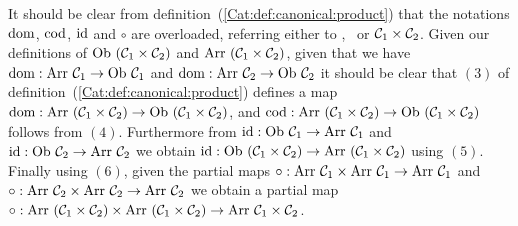 It should be clear from definition~(\ref{Cat:def:canonical:product}) that
the notations $\mbox{\rm dom}$, $\mbox{\rm cod}$, $\mbox{\rm id}$ and $\circ$ are overloaded, 
referring either to \Cone, \Ctwo\ or $\mbox{${\cal C}_{1}$}\times\mbox{${\cal C}_{2}$}$. Given our definitions 
of $\mbox{\rm Ob}\ (\mbox{${\cal C}_{1}$}\times\mbox{${\cal C}_{2}$})$ and $\mbox{\rm Arr}\ (\mbox{${\cal C}_{1}$}\times\mbox{${\cal C}_{2}$})$, given that we 
have $\mbox{\rm dom}:\mbox{\rm Arr}\ \mbox{${\cal C}_{1}$}\to\mbox{\rm Ob}\ \mbox{${\cal C}_{1}$}$ and $\mbox{\rm dom}:\mbox{\rm Arr}\ \mbox{${\cal C}_{2}$}\to\mbox{\rm Ob}\ \mbox{${\cal C}_{2}$}$ it 
should be clear that $(3)$ of definition~(\ref{Cat:def:canonical:product})
defines a map $\dom:\arr\ (\Cone\times\Ctwo)\to\ob\ (\Cone\times\Ctwo)$,
and $\cod:\arr\ (\Cone\times\Ctwo)\to\ob\ (\Cone\times\Ctwo)$
follows from $(4)$. Furthermore from $\id:\ob\ \Cone\to\arr\ \Cone$
and $\id:\ob\ \Ctwo\to\arr\ \Ctwo$ we obtain $\id:\ob\ (\Cone\times\Ctwo)
\to\arr\ (\Cone\times\Ctwo)$ using $(5)$. Finally using $(6)$, given 
the partial maps $\circ:\arr\ \Cone\times\arr\ \Cone\to\arr\ \Cone$
and $\circ:\arr\ \Ctwo\times\arr\ \Ctwo\to\arr\ \Ctwo$ we obtain
a partial map $\circ:\mbox{\rm Arr}\ (\mbox{${\cal C}_{1}$}\times\mbox{${\cal C}_{2}$})\times\mbox{\rm Arr}
\ (\mbox{${\cal C}_{1}$}\times\mbox{${\cal C}_{2}$})\to\mbox{\rm Arr}\ \mbox{${\cal C}_{1}$}\times\mbox{${\cal C}_{2}$}$.

